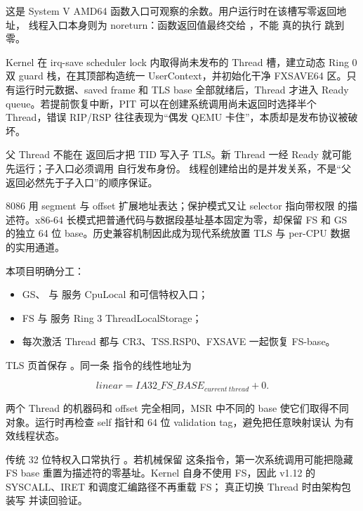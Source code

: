 这是 System V AMD64 函数入口可观察的余数。用户运行时在该槽写零返回地址，
线程入口本身则为 noreturn：函数返回值最终交给 ，不能
真的执行  跳到零。

Kernel 在 irq-save scheduler lock 内取得尚未发布的 Thread 槽，建立动态
Ring 0 双 guard 栈，在其顶部构造统一 UserContext，并初始化干净 FXSAVE64
区。只有运行时元数据、saved frame 和 TLS base 全部就绪后，Thread 才进入
Ready queue。若提前恢复中断，PIT 可以在创建系统调用尚未返回时选择半个
Thread，错误 RIP/RSP 往往表现为“偶发 QEMU 卡住”，本质却是发布协议被破坏。

\begin{failurebox}
父 Thread 不能在  返回后才把 TID 写入子 TLS。新 Thread
一经 Ready 就可能先运行；子入口必须调用  自行发布身份。
线程创建给出的是并发关系，不是“父返回必然先于子入口”的顺序保证。
\end{failurebox}

8086 用 segment 与 offset 扩展地址表达；保护模式又让 selector 指向带权限
的描述符。x86-64 长模式把普通代码与数据段基址基本固定为零，却保留 FS 和
GS 的独立 64 位 base。历史兼容机制因此成为现代系统放置 TLS 与 per-CPU
数据的实用通道。

本项目明确分工：

\begin{itemize}
  \item GS、 与  服务 CpuLocal
        和可信特权入口；
  \item FS 与  服务 Ring 3 ThreadLocalStorage；
  \item 每次激活 Thread 都与 CR3、TSS.RSP0、FXSAVE 一起恢复 FS-base。
\end{itemize}

TLS 页首保存 。同一条
 指令的线性地址为

\[
  linear = IA32\_FS\_BASE_{current\ thread}+0.
\]

两个 Thread 的机器码和 offset 完全相同，MSR 中不同的 base 使它们取得不同
对象。运行时再检查 self 指针和 64 位 validation tag，避免把任意映射误认
为有效线程状态。

传统 32 位特权入口常执行 。若机械保留
这条指令，第一次系统调用可能把隐藏 FS base 重置为描述符的零基址。Kernel
自身不使用 FS，因此 v1.12 的 SYSCALL、IRET 和调度汇编路径不再重载 FS；
真正切换 Thread 时由架构包装写  并读回验证。

